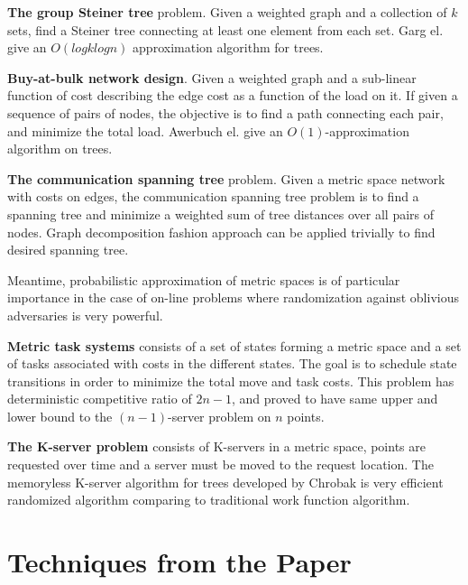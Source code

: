 \documentclass[11pt,twocolumn]{IEEEtran}
\begin{document}
{\bf The group Steiner tree} problem. Given a weighted graph and a collection of $k$ sets, find
a Steiner tree connecting at least one element from each set. Garg el.\cite{GKR98} give an $O(logklogn)$ approximation 
algorithm for trees.

{\bf Buy-at-bulk network design}. Given a weighted graph and a sub-linear function of cost
describing the edge cost as a function of the load on it. If given a sequence of pairs of nodes,
the objective is to find a path connecting each pair, and minimize the total load. Awerbuch el. \cite{AA97}
give an $O(1)$-approximation algorithm on trees.

{\bf The communication spanning tree} problem\cite{Hu74}. Given a metric space network with costs on edges, the
communication spanning tree problem is to find a spanning tree and minimize a weighted sum of tree distances
over all pairs of nodes. Graph decomposition fashion approach can be applied trivially to find
desired spanning tree.

Meantime, probabilistic approximation of metric spaces is of particular importance in the case of
on-line problems where randomization against oblivious adversaries is very powerful.

{\bf Metric task systems} consists of a set of states forming a metric space and a set of tasks 
associated with costs in the different states. The goal is to schedule state transitions in order to
minimize the total move and task costs. This problem has deterministic competitive ratio of $2n-1$, and
proved to have same upper and lower bound to the $(n-1)$-server problem on $n$ points.\cite{MMS88}

{\bf The K-server problem} consists of K-servers in a metric space, points are requested over time
and a server must be moved to the request location. The memoryless K-server algorithm for trees
developed by Chrobak\cite{CL91} is very efficient randomized algorithm comparing to traditional work function 
algorithm.

\section{Techniques from the Paper}
\end{document}
